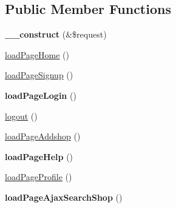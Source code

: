 \subsection*{Public Member Functions}
\begin{DoxyCompactItemize}
\item 
\hypertarget{classBasePageController_a483998015a3518d49897d271de2e3c2d}{{\bfseries \+\_\+\+\_\+construct} (\&\$request)}\label{classBasePageController_a483998015a3518d49897d271de2e3c2d}

\item 
\hyperlink{classBasePageController_a66084d1db3fcc8a5cb1f44cd82b7948a}{load\+Page\+Home} ()
\item 
\hyperlink{classBasePageController_aae6760084899d261e8f19f8dc2cbfd30}{load\+Page\+Signup} ()
\item 
\hypertarget{classBasePageController_a36cdd7c6a038c2664b333fbf8de6383a}{{\bfseries load\+Page\+Login} ()}\label{classBasePageController_a36cdd7c6a038c2664b333fbf8de6383a}

\item 
\hyperlink{classBasePageController_ad065341a301057b6b0dfc3b1e56ed56a}{logout} ()
\item 
\hyperlink{classBasePageController_aecf3ccde53aaa9b780feb5e12f2904ea}{load\+Page\+Addshop} ()
\item 
\hypertarget{classBasePageController_ae7ecc6f491f580059698d1a1a8e8d9ac}{{\bfseries load\+Page\+Help} ()}\label{classBasePageController_ae7ecc6f491f580059698d1a1a8e8d9ac}

\item 
\hyperlink{classBasePageController_affa5617be55ed9bf233fd7bd1b2e19c9}{load\+Page\+Profile} ()
\item 
\hypertarget{classBasePageController_a96ace79928e80d29e6560b1fb965e859}{{\bfseries load\+Page\+Ajax\+Search\+Shop} ()}\label{classBasePageController_a96ace79928e80d29e6560b1fb965e859}


\end{DoxyCompactItemize}
